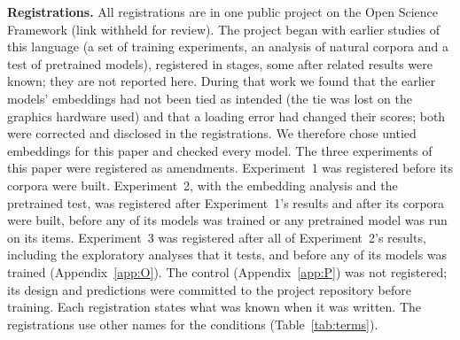 \FloatBarrier
{}\label{app:reg}
\setcounter{table}{0}\renewcommand{\thetable}{\thesection\arabic{table}}
\textbf{Registrations.} All registrations are in one public project on the Open Science Framework (link withheld for review). The project began with earlier studies of this language (a set of training experiments, an analysis of natural corpora and a test of pretrained models), registered in stages, some after related results were known; they are not reported here. During that work we found that the earlier models' embeddings had not been tied as intended (the tie was lost on the graphics hardware used) and that a loading error had changed their scores; both were corrected and disclosed in the registrations. We therefore chose untied embeddings for this paper and checked every model. The three experiments of this paper were registered as amendments. Experiment~1 was registered before its corpora were built. Experiment~2, with the embedding analysis and the pretrained test, was registered after Experiment~1's results and after its corpora were built, before any of its models was trained or any pretrained model was run on its items. Experiment~3 was registered after all of Experiment~2's results, including the exploratory analyses that it tests, and before any of its models was trained (Appendix~\ref{app:O}). The control (Appendix~\ref{app:P}) was not registered; its design and predictions were committed to the project repository before training. Each registration states what was known when it was written. The registrations use other names for the conditions (Table~\ref{tab:terms}).

